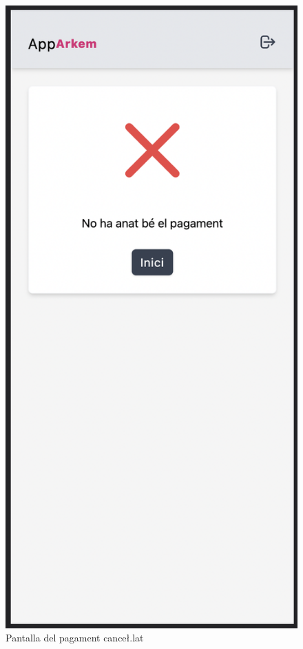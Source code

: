 \begin{figure}[H]
    \begin{center}
        \includegraphics[scale=0.50]{Fotos/pantalla6_pagamanet_cancel.png}
    \end{center}
    \caption{Pantalla del pagament cance\l.lat}
    \label{fig:payment_cancel_photo}
\end{figure}

